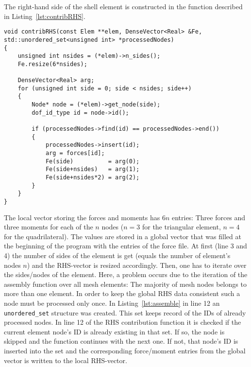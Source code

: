   The right-hand side of the shell element is constructed in the function described in Listing~\ref{lst:contribRHS}.
\begin{lstlisting}[caption=Contribute RHS function,label=lst:contribRHS]
void contribRHS(const Elem **elem, DenseVector<Real> &Fe, std::unordered_set<unsigned int> *processedNodes)
{
	unsigned int nsides = (*elem)->n_sides();
	Fe.resize(6*nsides);
	
	DenseVector<Real> arg;
	for (unsigned int side = 0; side < nsides; side++)
	{
		Node* node = (*elem)->get_node(side);
		dof_id_type id = node->id();
		
		if (processedNodes->find(id) == processedNodes->end())
		{
			processedNodes->insert(id);
			arg = forces[id];			
			Fe(side)          = arg(0);
			Fe(side+nsides)   = arg(1);
			Fe(side+nsides*2) = arg(2);
		}
	}
}
\end{lstlisting}
   The local vector storing the forces and moments has $6n$ entries: Three forces and three moments for each of the $n$ nodes ($n=3$ for the triangular element, $n=4$ for the quadrilateral). The values are stored in a global vector that was filled at the beginning of the program with the entries of the force file. At first (line 3 and 4) the number of sides of the element is get (equals the number of element's nodes $n$) and the RHS-vector is resized accordingly. Then, one has to iterate over the sides/nodes of the element. Here, a problem occurs due to the iteration of the assembly function over all mesh elements: The majority of mesh nodes belongs to more than one element. In order to keep the global RHS data consistent such a node must be processed only once. In Listing~\ref{lst:assemble} in line 12 an \texttt{unordered\_set} structure was created. This set keeps record of the IDs of already processed nodes. In line 12 of the RHS contribution function it is checked if the current element node's ID is already existing in that set. If so, the node is skipped and the function continues with the next one. If not, that node's ID is inserted into the set and the corresponding force/moment entries from the global vector is written to the local RHS-vector.



   
   

